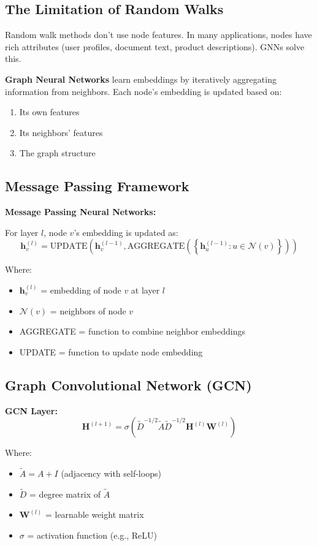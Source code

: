 \documentclass[12pt,a4paper]{article}
\begin{document}
\subsection{The Limitation of Random Walks}

Random walk methods don't use node features. In many applications, nodes have rich attributes (user profiles, document text, product descriptions). GNNs solve this.

\begin{concept}
\textbf{Graph Neural Networks} learn embeddings by iteratively aggregating information from neighbors. Each node's embedding is updated based on:
\begin{enumerate}
    \item Its own features
    \item Its neighbors' features
    \item The graph structure
\end{enumerate}
\end{concept}

\subsection{Message Passing Framework}

\begin{mathbox}
\textbf{Message Passing Neural Networks:}

For layer $l$, node $v$'s embedding is updated as:
\[
\mathbf{h}_v^{(l)} = \text{UPDATE}\left(\mathbf{h}_v^{(l-1)}, \text{AGGREGATE}\left(\left\{\mathbf{h}_u^{(l-1)} : u \in \mathcal{N}(v)\right\}\right)\right)
\]

Where:
\begin{itemize}
    \item $\mathbf{h}_v^{(l)}$ = embedding of node $v$ at layer $l$
    \item $\mathcal{N}(v)$ = neighbors of node $v$
    \item AGGREGATE = function to combine neighbor embeddings
    \item UPDATE = function to update node embedding
\end{itemize}
\end{mathbox}

\subsection{Graph Convolutional Network (GCN)}

\begin{mathbox}
\textbf{GCN Layer:}
\[
\mathbf{H}^{(l+1)} = \sigma\left(\tilde{D}^{-1/2}\tilde{A}\tilde{D}^{-1/2}\mathbf{H}^{(l)}\mathbf{W}^{(l)}\right)
\]

Where:
\begin{itemize}
    \item $\tilde{A} = A + I$ (adjacency with self-loops)
    \item $\tilde{D}$ = degree matrix of $\tilde{A}$
    \item $\mathbf{W}^{(l)}$ = learnable weight matrix
    \item $\sigma$ = activation function (e.g., ReLU)
\end{itemize}
\end{mathbox}
\end{document}
